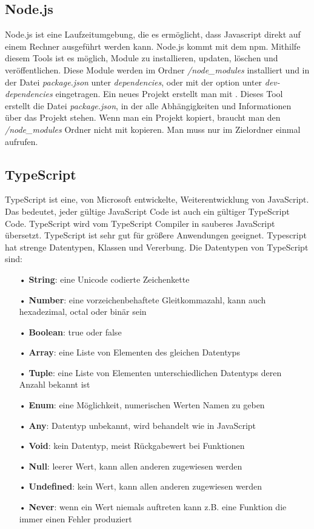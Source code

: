 \subsection{Node.js}
\label{sec:vor-node}
Node.js ist eine Laufzeitumgebung, die es ermöglicht, dass Javascript direkt auf einem Rechner ausgeführt werden kann. Node.js kommt mit dem \ac{npm}. Mithilfe diesem Tools ist es möglich, Module zu installieren, updaten, löschen und veröffentlichen. Diese Module werden im Ordner \textit{/node\_modules} installiert und in der Datei \textit{package.json} unter \textit{dependencies}, oder mit der option  unter \textit{dev-dependencies} eingetragen. Ein neues Projekt erstellt man mit . Dieses Tool erstellt die Datei \textit{package.json}, in der alle Abhängigkeiten und Informationen über das Projekt stehen. Wenn man ein Projekt kopiert, braucht man den \textit{/node\_modules} Ordner nicht mit kopieren. Man muss nur im Zielordner einmal  aufrufen.

\subsection{TypeScript}
\label{sec:vor-ts}
TypeScript ist eine, von Microsoft entwickelte, Weiterentwicklung von JavaScript. Das bedeutet, jeder gültige JavaScript Code ist auch ein gültiger TypeScript Code. TypeScript wird vom TypeScript Compiler in sauberes JavaScript übersetzt. TypeScript ist sehr gut für größere Anwendungen geeignet. Typescript hat strenge Datentypen, Klassen und Vererbung. Die Datentypen von TypeScript sind:

\begin{itemize}
\item[•] \textbf{String}: eine Unicode codierte Zeichenkette
\item[•] \textbf{Number}: eine vorzeichenbehaftete Gleitkommazahl, kann auch hexadezimal, octal oder binär sein
\item[•] \textbf{Boolean}: true oder false
\item[•] \textbf{Array}: eine Liste von Elementen des gleichen Datentyps
\item[•] \textbf{Tuple}: eine Liste von Elementen unterschiedlichen Datentyps deren Anzahl bekannt ist
\item[•] \textbf{Enum}: eine Möglichkeit, numerischen Werten Namen zu geben
\item[•] \textbf{Any}: Datentyp unbekannt, wird behandelt wie in JavaScript
\item[•] \textbf{Void}: kein Datentyp, meist Rückgabewert bei Funktionen
\item[•] \textbf{Null}: leerer Wert, kann allen anderen zugewiesen werden
\item[•] \textbf{Undefined}: kein Wert, kann allen anderen zugewiesen werden
\item[•] \textbf{Never}: wenn ein Wert niemals auftreten kann z.B. eine Funktion die immer einen Fehler produziert
\end{itemize}

